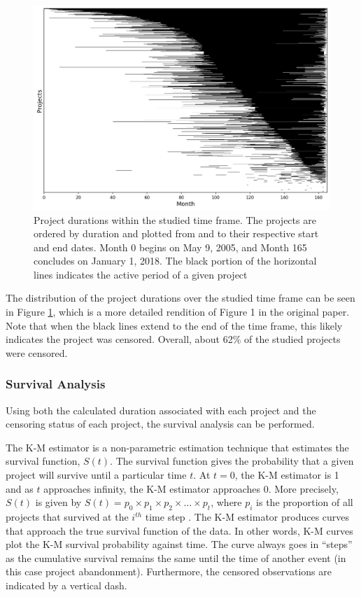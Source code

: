\documentclass[sigconf,review]{acmart}
\begin{document}
\begin{figure}[ht!]
    \centering
    \includegraphics[width=\columnwidth, keepaspectratio=true]{figure1.jpg}
    \caption{
        Project durations within the studied time frame.
        The projects are ordered by duration and plotted from and to their respective start and end dates.
        Month 0 begins on May 9, 2005, and Month 165 concludes on January 1, 2018.
        The black portion of the horizontal lines indicates the active period of a given project
        }
    \label{fig:figure-1}
\end{figure}

The distribution of the project durations over the studied time frame can be seen in Figure \ref{fig:figure-1}, which is a more detailed rendition of Figure 1 in the original paper.
Note that when the black lines extend to the end of the time frame, this likely indicates the project was censored.
Overall, about 62\% of the studied projects were censored.

\subsubsection{Survival Analysis} \label{surv_analysis}

Using both the calculated duration associated with each project and the censoring status of each project, the survival analysis can be performed.

The K-M estimator is a non-parametric estimation technique that estimates the survival function, $S(t)$.
The survival function gives the probability that a given project will survive until a particular time $t$.
At $t = 0$, the K-M estimator is 1 and as $t$ approaches infinity, the K-M estimator approaches 0.
More precisely, $S(t)$ is given by  $S(t) = p_0 \times p_1 \times p_2 \times \dots \times p_t$, where $p_i$ is the proportion of all projects that survived at the $i^{th}$ time step \cite{kaplan1958nonparametric}.
The K-M estimator produces curves that approach the true survival function of the data.
In other words, K-M curves plot the K-M survival probability against time.
The curve always goes in ``steps'' as the cumulative survival remains the same until the time of another event (in this case project abandonment). Furthermore, the censored observations are indicated by a vertical dash.
\end{document}
